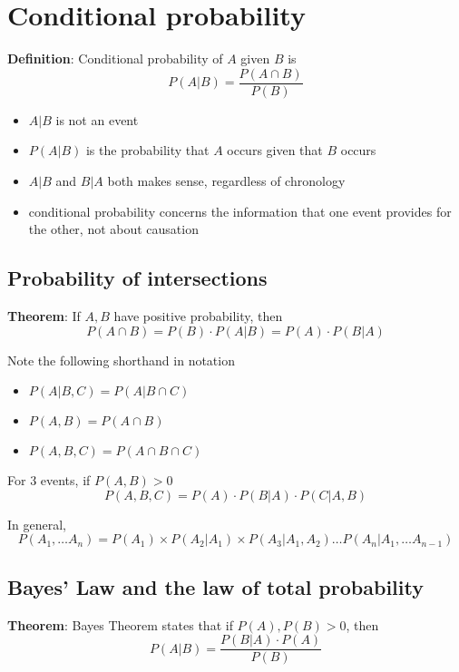 \section{Conditional probability}
\begin{framed}
\textbf{Definition}: Conditional probability of $A$ given $B$ is 
\[
  P(A|B) = \frac{P(A\cap B)}{P(B)}
\] 

\begin{itemize}
   \item $A|B$ is not an event
   \item $P(A|B)$ is the probability that $A$ occurs given that $B$ occurs  
   \item $A|B $ and $B|A$ both makes sense, regardless of chronology
   \item conditional probability concerns the information that one event provides for the other, not about causation
\end{itemize}


\end{framed}

\subsection{Probability of intersections}
\begin{framed}
   \textbf{Theorem}: If $A, B$ have positive probability, then
\[
  P(A \cap B) = P(B) \cdot P(A |B) = P(A) \cdot P(B | A)
\] 

Note the following shorthand in notation
\begin{itemize}
   \item $P(A|B, C) = P(A | B \cap C)$ 
   \item $P(A, B) = P(A \cap B)$
   \item  $P(A, B, C) = P(A \cap B \cap C)$
\end{itemize}

For 3 events, if $P(A, B) > 0$
 \[
  P(A, B, C) = P(A) \cdot P(B|A) \cdot P(C | A, B)
 \] 

 In general,
 \[
    P(A_1, \hdots A_n) = P(A_1) \times P(A_2 | A_1) \times P(A_3 | A_1, A_2) \hdots P(A_n | A_1 , \hdots A_{n-1})
 \] 
\end{framed}




\subsection{Bayes' Law and the law of total probability}
\begin{framed}
   \textbf{Theorem}: Bayes Theorem states that if $P(A), P(B) > 0$, then
 \[
  P(A|B) = \frac{P(B|A) \cdot P(A)}{P(B)}
\]
\end{framed}

